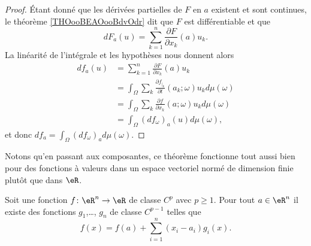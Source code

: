 \begin{proof}
    Étant donné que les dérivées partielles de \( F\) en \( a\) existent et sont continues, le théorème \ref{THOooBEAOooBdvOdr} dit que \( F\) est différentiable et que
    \begin{equation}
        dF_a(u)=\sum_{k=1}^n\frac{ \partial F }{ \partial x_k }(a)u_k.
    \end{equation}
    La linéarité de l'intégrale et les hypothèses nous donnent alors
    \begin{subequations}
        \begin{align}
            df_a(u)&=\sum_{k=1}^n\frac{ \partial F }{ \partial x_k }(a)u_k\\
            &=\int_{\Omega}\sum_k\frac{ \partial f_{|_k} }{ \partial t }(a_k;\omega)u_kd\mu(\omega)\\
            &=\int_{\Omega}\sum_k\frac{ \partial f }{ \partial x_k }(a;\omega)u_kd\mu(\omega)\\
            &=\int_{\Omega}(df_{\omega})_a(u)d\mu(\omega),
        \end{align}
    \end{subequations}
    et donc \( df_a=\int_{\Omega}(df_{\omega})_ad\mu(\omega)\).
\end{proof}
Notons qu'en passant aux composantes, ce théorème fonctionne tout aussi bien pour des fonctions à valeurs dans un espace vectoriel normé de dimension finie plutôt que dans \( \eR\).

\begin{lemma}   \label{LemWNBooGPlIwT}
    Soit une fonction \( f\colon \eR^n\to \eR\) de classe \( C^p\) avec \( p\geq 1\). Pour tout \( a\in \eR^n\) il existe des fonctions \( g_1\),\ldots, \( g_n\) de classe \( C^{p-1}\) telles que
    \begin{equation}
        f(x)=f(a)+\sum_{i=1}^n(x_i-a_i)g_i(x).
    \end{equation}
\end{lemma}

